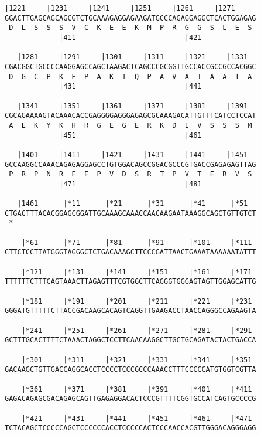\documentclass{article}
\begin{document}
\newpage
\begin{Verbatim}[fontfamily=courier]
   |1221     |1231     |1241     |1251     |1261     |1271  
GGACTTGAGCAGCAGCGTCTGCAAAGAGGAGAAGATGCCCAGAGGAGGCTCACTGGAGAG
 D  L  S  S  S  V  C  K  E  E  K  M  P  R  G  G  S  L  E  S 
             |411                          |421             

   |1281     |1291     |1301     |1311     |1321     |1331  
CGACGGCTGCCCCAAGGAGCCAGCTAAGACTCAGCCCGCGGTTGCCACCGCCGCCACGGC
 D  G  C  P  K  E  P  A  K  T  Q  P  A  V  A  T  A  A  T  A 
             |431                          |441             

   |1341     |1351     |1361     |1371     |1381     |1391  
CGCAGAAAAGTACAAACACCGAGGGGAGGGAGAGCGCAAAGACATTGTTTCATCCTCCAT
 A  E  K  Y  K  H  R  G  E  G  E  R  K  D  I  V  S  S  S  M 
             |451                          |461             

   |1401     |1411     |1421     |1431     |1441     |1451  
GCCAAGGCCAAACAGAGAGGAGCCTGTGGACAGCCGGACGCCCGTGACCGAGAGAGTTAG
 P  R  P  N  R  E  E  P  V  D  S  R  T  P  V  T  E  R  V  S 
             |471                          |481             

   |1461      |*11      |*21      |*31      |*41      |*51  
CTGACTTTACACGGAGCGGATTGCAAAGCAAACCAACAAGAATAAAGGCAGCTGTTGTCT
 *   

    |*61      |*71      |*81      |*91      |*101     |*111 
CTTCTCCTTATGGGTAGGGCTCTGACAAAGCTTCCCGATTAACTGAAATAAAAAATATTT

    |*121     |*131     |*141     |*151     |*161     |*171 
TTTTTTCTTTCAGTAAACTTAGAGTTTCGTGGCTTCAGGGTGGGAGTAGTTGGAGCATTG

    |*181     |*191     |*201     |*211     |*221     |*231 
GGGATGTTTTTCTTACCGACAAGCACAGTCAGGTTGAAGACCTAACCAGGGCCAGAAGTA

    |*241     |*251     |*261     |*271     |*281     |*291 
GCTTTGCACTTTTCTAAACTAGGCTCCTTCAACAAGGCTTGCTGCAGATACTACTGACCA

    |*301     |*311     |*321     |*331     |*341     |*351 
GACAAGCTGTTGACCAGGCACCTCCCCTCCCGCCCAAACCTTTCCCCCATGTGGTCGTTA

    |*361     |*371     |*381     |*391     |*401     |*411 
GAGACAGAGCGACAGAGCAGTTGAGAGGACACTCCCGTTTTCGGTGCCATCAGTGCCCCG

    |*421     |*431     |*441     |*451     |*461     |*471 
TCTACAGCTCCCCCAGCTCCCCCCACCTCCCCCACTCCCAACCACGTTGGGACAGGGAGG

\end{Verbatim}
\newpage
\end{document}
